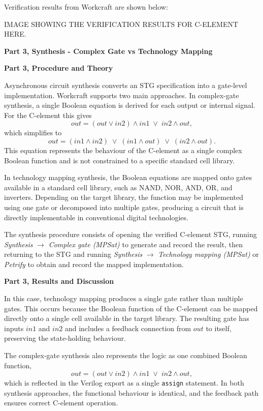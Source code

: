 \documentclass[a4paper,12pt]{article}
\begin{document}
Verification results from Workcraft are shown below:

\begin{large}
    IMAGE SHOWING THE VERIFICATION RESULTS FOR C-ELEMENT HERE.
\end{large}

\textbf{Part 3, Synthesis - Complex Gate vs Technology Mapping}

\textbf{Part 3, Procedure and Theory}

Asynchronous circuit synthesis converts an STG specification into a gate-level implementation. Workcraft supports two main approaches. In complex-gate synthesis, a single Boolean equation is derived for each output or internal signal. For the C-element this gives
\[
out = (out \lor in2)\land in1 \;\lor\; in2 \land out,
\]
which simplifies to
\[
out = (in1 \land in2) \;\lor\; (in1 \land out) \;\lor\; (in2 \land out).
\]
This equation represents the behaviour of the C-element as a single complex Boolean function and is not constrained to a specific standard cell library.

In technology mapping synthesis, the Boolean equations are mapped onto gates available in a standard cell library, such as NAND, NOR, AND, OR, and inverters. Depending on the target library, the function may be implemented using one gate or decomposed into multiple gates, producing a circuit that is directly implementable in conventional digital technologies.

The synthesis procedure consists of opening the verified C-element STG, running \textit{Synthesis} $\rightarrow$ \textit{Complex gate (MPSat)} to generate and record the result, then returning to the STG and running \textit{Synthesis} $\rightarrow$ \textit{Technology mapping (MPSat)} or \textit{Petrify} to obtain and record the mapped implementation.

\textbf{Part 3, Results and Discussion}

In this case, technology mapping produces a single gate rather than multiple gates. This occurs because the Boolean function of the C-element can be mapped directly onto a single cell available in the target library. The resulting gate has inputs $in1$ and $in2$ and includes a feedback connection from $out$ to itself, preserving the state-holding behaviour.

The complex-gate synthesis also represents the logic as one combined Boolean function,
\[
out = (out \lor in2)\land in1 \;\lor\; in2 \land out,
\]
which is reflected in the Verilog export as a single \texttt{assign} statement. In both synthesis approaches, the functional behaviour is identical, and the feedback path ensures correct C-element operation.
\end{document}
